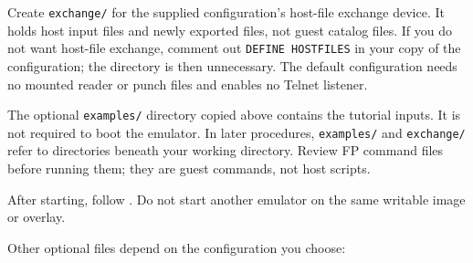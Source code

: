 
Create \passthrough{\lstinline!exchange/!} for the supplied configuration's host-file exchange device. It holds host input files and newly exported files, not guest catalog files. If you do not want host-file exchange, comment out \passthrough{\lstinline!DEFINE HOSTFILES!} in your copy of the configuration; the directory is then unnecessary. The default configuration needs no mounted reader or punch files and enables no Telnet listener.

The optional \texttt{examples/} directory copied above contains the tutorial
inputs. It is not required to boot the emulator. In later procedures,
\texttt{examples/} and \texttt{exchange/} refer to directories beneath your
working directory. Review FP command files before running them; they are guest
commands, not host scripts.

After starting, follow .
Do not start another emulator on the same writable image or overlay.

Other optional files depend on the configuration you choose:

